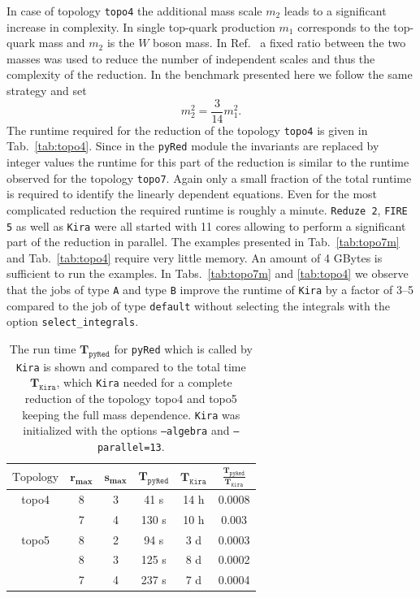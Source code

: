 \documentclass[a4paper,12pt]{scrartcl}
\newcommand*{\mr}{\mathrm}
\newcommand*{\bm}{\boldsymbol}
\newcommand*{\kira}{\texttt{Kira}}
\newcommand*{\pyred}{\texttt{pyRed}}
\newcommand*{\firefive}{\texttt{FIRE\,5}}
\newcommand*{\reduzetwo}{\texttt{Reduze\,2}}
\def\Tab#1{{Tab.~\ref{#1}}}
\begin{document}
In case of topology \texttt{topo4} the additional mass scale $m_2$
leads to a significant increase in complexity. In single top-quark
production $m_1$ corresponds to the top-quark mass and $m_2$ is
the $W$ boson mass. In Ref.~\cite{Assadsolimani:2014oga} a fixed
ratio between the two masses was used to reduce the number of
independent scales and thus the complexity of the reduction. In the
benchmark presented here we follow the same strategy and set
\begin{equation}
  m_{2}^2=\frac{3}{14}m_{1}^{2}.
\end{equation}
The runtime required for the reduction of the topology \texttt{topo4} is
given in \Tab{tab:topo4}. Since in the \pyred{} module the invariants are
replaced by integer values the runtime for this part of the reduction
is similar to the runtime observed for the topology \texttt{topo7}.
Again only a small fraction of the total runtime is required to
identify the linearly dependent equations. Even for the most
complicated reduction the required runtime is roughly a minute.
\reduzetwo{}, \firefive{} as well as \kira{} were all started with 11 cores allowing to
perform a significant part of the reduction in parallel.
The examples presented in \Tab{tab:topo7m} and \Tab{tab:topo4} require
very little memory. An amount of 4 GBytes is sufficient to run the examples.
In Tabs.~\ref{tab:topo7m} and \ref{tab:topo4} we observe that the jobs of type \texttt{A} and type \texttt{B} improve the runtime of \texttt{Kira} by a factor of 3--5 compared to the job of type \texttt{default} without selecting the integrals with the option \texttt{select\_integrals}.

\begin{table}[htpb]
  \caption{The run time $\bm{T_\pyred}$ for \pyred{} which is called
    by \kira{} is shown and compared to the total time $\bm{T_\kira}$,
    which \kira{} needed for a complete reduction of the topology topo4 and
    topo5 keeping the full mass dependence. \kira{} was initialized
    with the options
    \texttt{--algebra} and \texttt{--parallel=13}.}
  \label{tab:topo4andtopo5-with-full-mass-dep}\renewcommand{\arraystretch}{1.3}
  \begin{center}
  \begin{tabular}[\linewidth]{cccccc}
    \hline
    $\bm{\mr{Topology}}$&$\bm{r_{\max}}$&$\bm{s_{\max}}$&
    $\bm{T_\pyred}$ &
    $\bm{T_\kira}$ & $\frac{\bm{T_\pyred}}{\bm{T_\kira}}$ \\
    \hline
    topo4 & 8 & 3 & 41 s   & 14 h & 0.0008  \\
    & 7 & 4 & 130 s  & 10 h & 0.003   \\\hline
    topo5 & 8 & 2 & 94 s   & 3 d  & 0.0003  \\
    & 8 & 3 & 125 s  & 8 d  & 0.0002  \\
    & 7 & 4 & 237 s  & 7 d  & 0.0004  \\\hline
  \end{tabular}
  \end{center}
\end{table}
\end{document}
